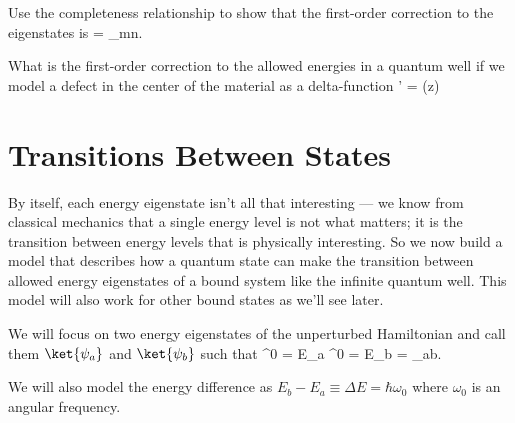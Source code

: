 \begin{exercise}
Use the completeness relationship to show that the first-order correction to the eigenstates is
\beq
{} = \sum_{m\neq n}.
\eeq
\end{exercise}

\begin{exercise}
What is the first-order correction to the allowed energies in a quantum well if we model a defect in the center of the material as a delta-function
\beq
{}' = \alpha \;\delta(z)
\eeq

\end{exercise}




\chapter{Transitions Between States}


By itself, each energy eigenstate isn't all that interesting --- we know from classical mechanics that a single energy level is not what matters; it is the transition between energy levels that is physically interesting. So we now build a model that describes how a quantum state can make the transition between allowed energy eigenstates of a bound system like the infinite quantum well. This model will also work for other bound states as we'll see later.

We will focus on two energy eigenstates of the unperturbed Hamiltonian and call them $\ket{\psi_a}$ and $\ket{\psi_b}$ such that
\beq
{}^0 = E_a   ^0 = E_b    = \delta_{ab}.
\eeq%
\begin{marginfigure}
\end{marginfigure}%
We will also model the energy difference as $E_b - E_a \equiv \Delta E = \hbar \omega_0$ where $\omega_0$ is an angular frequency.

